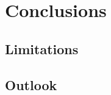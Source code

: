 \chapter{Conclusions}%
\label{ch:conclusions}%
\lipsum%
\section{Limitations}%
\label{sec:limitations}%
\lipsum%
\section{Outlook}%
\label{sec:outlook}%
\lipsum%